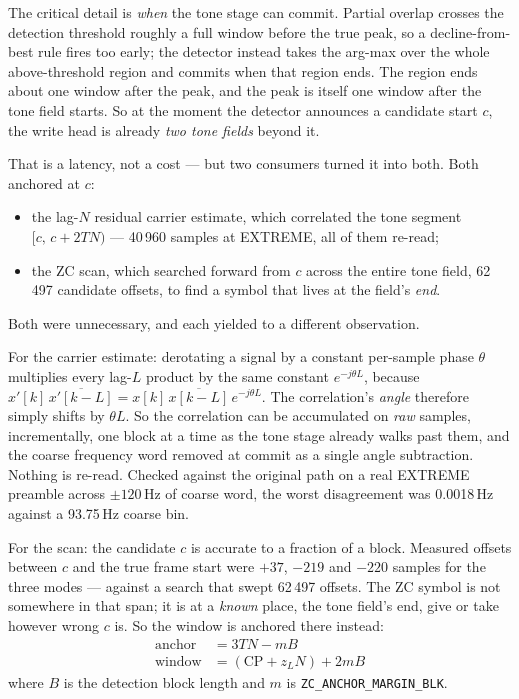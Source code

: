 The critical detail is \emph{when} the tone stage can commit. Partial
overlap crosses the detection threshold roughly a full window before the
true peak, so a decline-from-best rule fires too early; the detector
instead takes the arg-max over the whole above-threshold region and
commits when that region ends. The region ends about one window after
the peak, and the peak is itself one window after the tone field starts.
So at the moment the detector announces a candidate start $c$, the write
head is already \emph{two tone fields} beyond it.

That is a latency, not a cost --- but two consumers turned it into both.
Both anchored at $c$:

\begin{itemize}
    \item the lag-$N$ residual carrier estimate, which correlated the
          tone segment $[c,\,c+2TN)$ --- 40\,960 samples at EXTREME, all
          of them re-read;
    \item the ZC scan, which searched forward from $c$ across the entire
          tone field, 62\,497 candidate offsets, to find a
          symbol that lives at the field's \emph{end}.
\end{itemize}

Both were unnecessary, and each yielded to a different observation.

For the carrier estimate: derotating a signal by a constant per-sample
phase $\theta$ multiplies every lag-$L$ product by the same constant
$e^{-j\theta L}$, because $x'[k]\,\overline{x'[k-L]} =
x[k]\,\overline{x[k-L]}\,e^{-j\theta L}$. The correlation's
\emph{angle} therefore simply shifts by $\theta L$. So the correlation
can be accumulated on \emph{raw} samples, incrementally, one block at a
time as the tone stage already walks past them, and the coarse frequency
word removed at commit as a single angle subtraction. Nothing is
re-read. Checked against the original path on a real EXTREME preamble
across $\pm 120$\,Hz of coarse word, the worst disagreement was 0.0018\,Hz
against a 93.75\,Hz coarse bin.

For the scan: the candidate $c$ is accurate to a fraction of a block.
Measured offsets between $c$ and the true frame start were $+37$,
$-219$ and $-220$ samples for the three modes --- against a search that
swept 62\,497 offsets. The ZC symbol is not somewhere in that span; it
is at a \emph{known} place, the tone field's end, give or take however
wrong $c$ is. So the window is anchored there instead:
%
\begin{align}
    \text{anchor} &= 3TN - m B \\
    \text{window} &= (\mathrm{CP} + z_L N) + 2 m B
\end{align}
%
where $B$ is the detection block length and $m$ is
\texttt{ZC\_ANCHOR\_MARGIN\_BLK}.

